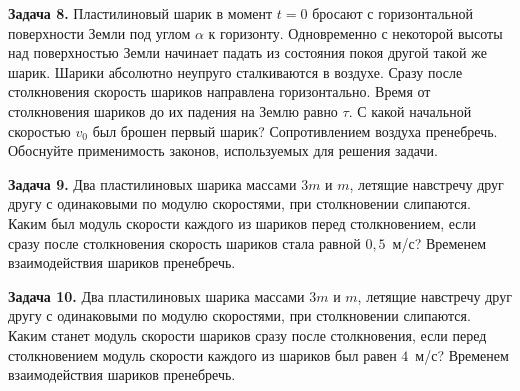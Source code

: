 \begin{taskbasic}[code={\label{task:momentum_v16_n26}}]
\textbf{Задача 8.} Пластилиновый шарик в момент $t = 0$ бросают с горизонтальной поверхности Земли под углом $\alpha$ к горизонту. Одновременно с некоторой высоты над поверхностью Земли начинает падать из состояния покоя другой такой же шарик. Шарики абсолютно неупруго сталкиваются в воздухе. Сразу после столкновения скорость шариков направлена горизонтально. Время от столкновения шариков до их падения на Землю равно $\tau$. С какой начальной скоростью $v_0$ был брошен первый шарик? Сопротивлением воздуха пренебречь. Обоснуйте применимость законов, используемых для решения задачи.

\end{taskbasic}

\begin{taskbasic}[code={\label{task:momentum_v25_n22}}]
\textbf{Задача 9.} Два пластилиновых шарика массами $3m$ и $m$, летящие навстречу друг другу с одинаковыми по модулю скоростями, при столкновении слипаются. Каким был модуль скорости каждого из шариков перед столкновением, если сразу после столкновения скорость шариков стала равной $0{,}5$~м/с? Временем взаимодействия шариков пренебречь.

\end{taskbasic}

\begin{taskbasic}[code={\label{task:momentum_v26_n22}}]
\textbf{Задача 10.} Два пластилиновых шарика массами $3m$ и $m$, летящие навстречу друг другу с одинаковыми по модулю скоростями, при столкновении слипаются. Каким станет модуль скорости шариков сразу после столкновения, если перед столкновением модуль скорости каждого из шариков был равен $4$~м/с? Временем взаимодействия шариков пренебречь.

\end{taskbasic}
